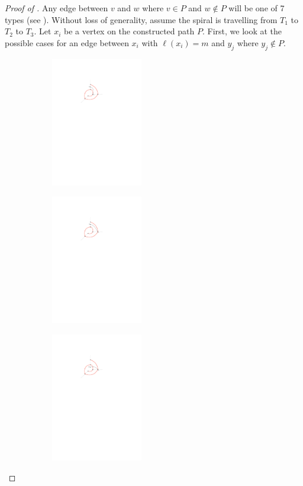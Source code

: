 \documentclass{patmorin}
\begin{document}
\begin{proof}[Proof of ]
 Any edge between $v$ and $w$ where $v \in P$ and $w \not\in P$ will be one of 7 types (see ).
 Without loss of generality, assume the spiral is travelling from $T_1$ to $T_2$ to $T_3$. Let $x_i$ be a vertex on the constructed path $P$. 
 First, we look at the possible cases for an edge between $x_i$ with $\ell(x_i) = m$ and $y_j$ where $y_j \notin P$.
 
 
 \renewcommand{\thesubfigure}{\arabic{subfigure}}
  \begin{figure}
    \begin{center}
    \begin{subfigure}[t]{0.3\hsize}\includegraphics[width=40mm]{figs/2layermaximum-1} \caption{}\end{subfigure}
    \begin{subfigure}[t]{0.3\hsize}\includegraphics[width=40mm]{figs/2layermaximum-2} \caption{}\end{subfigure}
    \begin{subfigure}[t]{0.3\hsize}\includegraphics[width=40mm]{figs/2layermaximum-3} \caption{}\end{subfigure}

\end{center}
\end{figure}
\end{proof}
\end{document}
